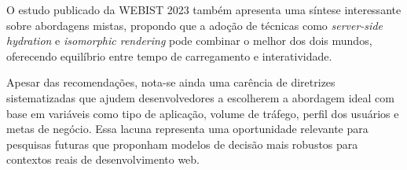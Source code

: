O estudo publicado da WEBIST 2023 \cite{2023} também apresenta uma síntese interessante sobre abordagens mistas, propondo que a adoção de técnicas como \textit{server-side hydration} e \textit{isomorphic rendering} pode combinar o melhor dos dois mundos, oferecendo equilíbrio entre tempo de carregamento e interatividade.

Apesar das recomendações, nota-se ainda uma carência de diretrizes sistematizadas que ajudem desenvolvedores a escolherem a abordagem ideal com base em variáveis como tipo de aplicação, volume de tráfego, perfil dos usuários e metas de negócio. Essa lacuna representa uma oportunidade relevante para pesquisas futuras que proponham modelos de decisão mais robustos para contextos reais de desenvolvimento web.


